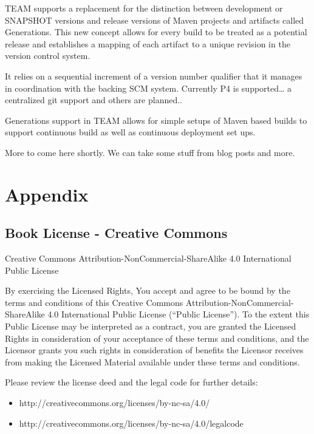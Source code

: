 \documentclass[a4paper]{book}
\newcounter{tab}[chapter]
\newcommand{\chap}[1]{\newpage\thispagestyle{empty}\chapter{#1}\label{chap:\thechapter}}
\begin{document}
TEAM supports a replacement for the distinction between development or SNAPSHOT versions and release versions of Maven projects and artifacts called Generations. This new concept allows for every build to be treated as a potential release and establishes a mapping of each artifact to a unique revision in the version control system.

It relies on a sequential increment of a version number qualifier that it manages in coordination with the backing SCM system. Currently P4 is supported\ldots{} a centralized git support and others are planned..

Generations support in TEAM allows for simple setups of Maven based builds to support continuous build as well as continuous deployment set ups.

More to come here shortly. We can take some stuff from blog posts and more.

\chap{Appendix}\label{appendix}

\section{Book License - Creative Commons}\label{book-license---creative-commons}

Creative Commons Attribution-NonCommercial-ShareAlike 4.0 International Public License

By exercising the Licensed Rights, You accept and agree to be bound by the terms and conditions of this Creative Commons Attribution-NonCommercial-ShareAlike 4.0 International Public License (“Public License”). To the extent this Public License may be interpreted as a contract, you are granted the Licensed Rights in consideration of your acceptance of these terms and conditions, and the Licensor grants you such rights in consideration of benefits the Licensor receives from making the Licensed Material available under these terms and conditions.

Please review the license deed and the legal code for further details:

\begin{itemize}
\itemsep1pt\parskip0pt
\item
  http://creativecommons.org/licenses/by-nc-sa/4.0/
\item
  http://creativecommons.org/licenses/by-nc-sa/4.0/legalcode
\end{itemize}
\end{document}
